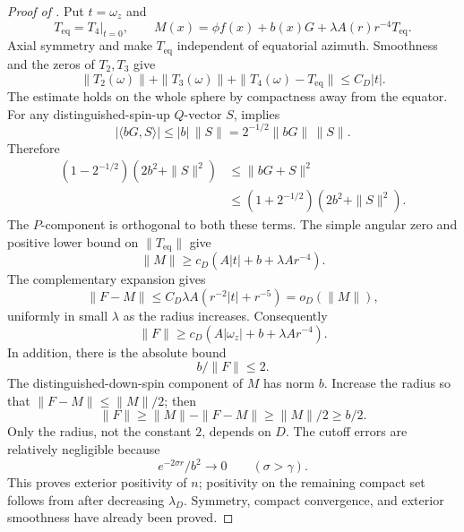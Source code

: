 \begin{proof}[Proof of ]
Put \(t=\omega_z\) and
\[
 T_{\mathrm{eq}}=T_4|_{t=0},\qquad
 M(x)=\phi f(x)+b(x)G+\lambda A(r)r^{-4}T_{\mathrm{eq}}.
 \]
Axial symmetry and  make
\(T_{\mathrm{eq}}\) independent of equatorial azimuth.
Smoothness and the zeros of \(T_2,T_3\) give
\[
 \|T_2(\omega)\|+\|T_3(\omega)\|
       +\|T_4(\omega)-T_{\mathrm{eq}}\|\leq C_D|t|.
 \]
The estimate holds on the whole sphere by compactness away from
the equator.  For any distinguished-spin-up \(Q\)-vector \(S\),
 implies
\[
 |\langle bG,S\rangle|
 \leq |b|\,\|S\|=2^{-1/2}\|bG\|\,\|S\|.
 \]
Therefore
\begin{equation}
 \begin{split}
 (1-2^{-1/2})(2b^2+\|S\|^2)
 &\leq\|bG+S\|^2\\
 &\leq(1+2^{-1/2})(2b^2+\|S\|^2).
 \end{split}
 \label{eq:spin-noncancellation}
\end{equation}
The \(P\)-component is orthogonal to both these terms.  The simple
angular zero and positive lower bound on \(\|T_{\mathrm{eq}}\|\)
give
\[
 \|M\|\geq c_D(A|t|+b+\lambda Ar^{-4}).
 \]
The complementary expansion gives
\[
 \|F-M\|\leq C_D\lambda A(r^{-2}|t|+r^{-5})=o_D(\|M\|),
 \]
uniformly in small \(\lambda\) as the radius increases.
Consequently
\begin{equation}
 \|F\|\geq c_D(A|\omega_z|+b+\lambda Ar^{-4}).
 \label{eq:three-scale-lower-bound}
\end{equation}
In addition, there is the absolute bound
\begin{equation}
 b/\|F\|\leq2.
 \label{eq:absolute-core-ratio}
\end{equation}
The distinguished-down-spin component of \(M\) has norm \(b\).
Increase the radius so that \(\|F-M\|\leq\|M\|/2\); then
\[
 \|F\|\geq\|M\|-\|F-M\|\geq\|M\|/2\geq b/2.
\]
Only the radius, not the constant \(2\),
depends on \(D\).
The cutoff errors are relatively negligible because
\[
 e^{-2\sigma r}/b^2\longrightarrow0\qquad(\sigma>\gamma).
 \]
This proves exterior positivity of \(n\); positivity on the
remaining compact set follows from
 after decreasing \(\lambda_D\).
Symmetry, compact convergence, and exterior smoothness have
already been proved.


\end{proof}
